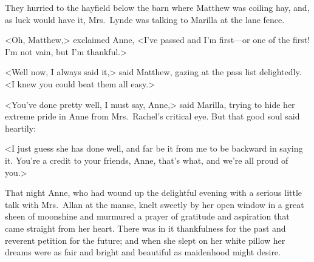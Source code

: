They hurried to the hayfield below the barn where Matthew was coiling hay, and, as luck would have it, Mrs.~Lynde was talking to Marilla at the lane fence.

<Oh, Matthew,> exclaimed Anne, <I've passed and I'm first—or one of the first! I'm not vain, but I'm thankful.>

<Well now, I always said it,> said Matthew, gazing at the pass list delightedly. <I knew you could beat them all easy.>

<You've done pretty well, I must say, Anne,> said Marilla, trying to hide her extreme pride in Anne from Mrs.~Rachel's critical eye. But that good soul said heartily:

<I just guess she has done well, and far be it from me to be backward in saying it. You're a credit to your friends, Anne, that's what, and we're all proud of you.>

That night Anne, who had wound up the delightful evening with a serious little talk with Mrs.~Allan at the manse, knelt sweetly by her open window in a great sheen of moonshine and murmured a prayer of gratitude and aspiration that came straight from her heart. There was in it thankfulness for the past and reverent petition for the future; and when she slept on her white pillow her dreams were as fair and bright and beautiful as maidenhood might desire.